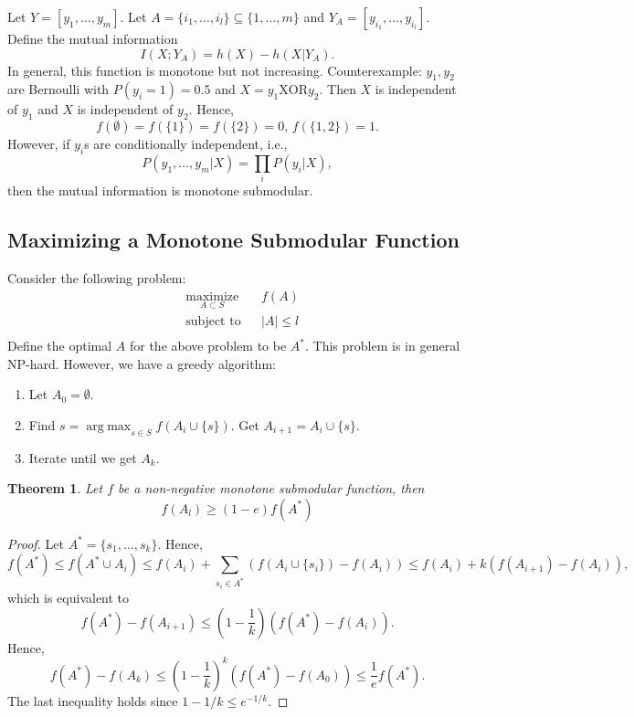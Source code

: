 \documentclass{article}
\newtheorem{theorem}{Theorem}
\DeclareMathOperator*{\argmax}{arg\; max}     %
\begin{document}
Let $Y = [y_1,\dots,y_m]$. Let $A = \{i_1,\dots,i_l\}\subseteq\{1,\dots,m\}$ and $Y_A = [y_{i_1},\dots,y_{i_l}]$. Define the mutual information 
\begin{displaymath}
  I(X;Y_A) = h(X) - h(X|Y_A). 
\end{displaymath}
In general, this function is monotone but not increasing. Counterexample: $y_1,y_2$ are Bernoulli with $P(y_i = 1) = 0.5$ and $X = y_1 \text{XOR} y_2$. Then $X$ is independent of $y_1$ and $X$ is independent of $y_2$. Hence,
\begin{displaymath}
  f(\emptyset) = f(\{1\}) = f(\{2\}) = 0, \, f(\{1,2\}) = 1. 
\end{displaymath}
However, if $y_i$s are conditionally independent, i.e., 
\begin{displaymath}
 P(y_1,\dots,y_m|X) = \prod_i P(y_i|X),
\end{displaymath}
then the mutual information is monotone submodular.

\subsection{Maximizing a Monotone Submodular Function}
Consider the following problem:
\begin{align*}
  &\mathop{\textrm{maximize}}\limits_{A\subset S}&
  & f(A)\\
  &\textrm{subject to}&
  & |A|\leq l\\
\end{align*}
Define the optimal $A$ for the above problem to be $A^*$. This problem is in general NP-hard. However, we have a greedy algorithm:
\begin{enumerate}
  \item Let $A_0 = \emptyset$.
  \item Find $s = \argmax_{s\in S} f(A_i\cup\{s\})$. Get $A_{i+1} = A_i \cup \{s\}$.
  \item Iterate until we get $A_k$.
\end{enumerate}

\begin{theorem}
  Let $f$ be a non-negative monotone submodular function, then
  \begin{displaymath}
   f(A_l) \geq (1-e)f(A^*) 
  \end{displaymath}
\end{theorem}
\begin{proof}
  Let $A^* = \{s_1,\dots,s_k\}$. Hence,
  \begin{displaymath}
    f(A^*)\leq f(A^*\cup A_i) \leq f(A_i) + \sum_{s_i\in A^*} (f(A_i\cup\{s_i\})-f(A_i))\leq f(A_i) + k (f(A_{i+1}) - f(A_i)),
  \end{displaymath}
 which is equivalent to
 \begin{displaymath}
   f(A^*) - f(A_{i+1}) \leq  \left( 1-\frac{1}{k} \right)(f(A^*) - f(A_i)).
 \end{displaymath}
 Hence,
 \begin{displaymath}
   f(A^*) - f(A_k) \leq \left( 1-\frac{1}{k} \right)^k (f(A^*)-f(A_0)) \leq \frac{1}{e} f(A^*). 
 \end{displaymath}
 The last inequality holds since $1-1/k \leq e^{-1/k}$.
\end{proof}
\end{document}
